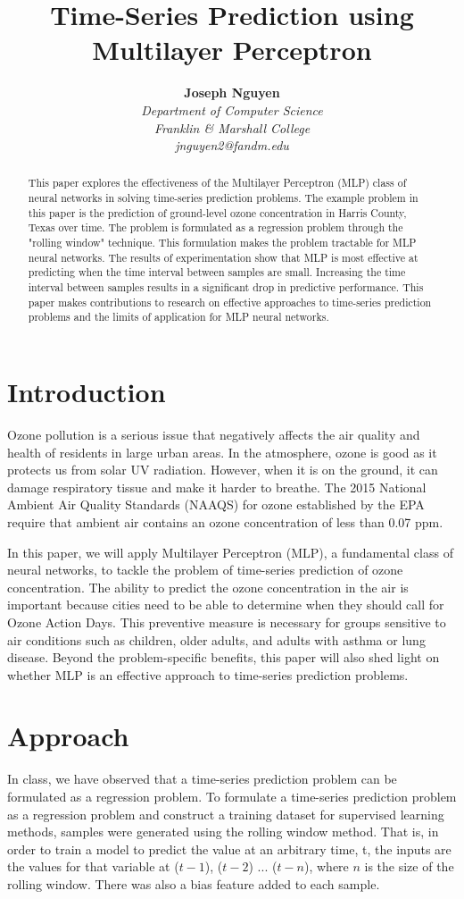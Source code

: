 \documentclass{article}
\title{\textbf{Time-Series Prediction using Multilayer Perceptron}}
\author{
    \textbf{Joseph Nguyen} \\
    \textit{Department of Computer Science} \\
    \textit{Franklin \& Marshall College} \\
    \textit{jnguyen2@fandm.edu}
}
\date{}
\begin{document}
\maketitle
\begin{abstract}
    This paper explores the effectiveness of the Multilayer Perceptron (MLP) class of neural networks in solving time-series prediction problems. The example problem in this paper is the prediction of ground-level ozone concentration in Harris County, Texas over time. The problem is formulated as a regression problem through the "rolling window" technique. This formulation makes the problem tractable for MLP neural networks. The results of experimentation show that MLP is most effective at predicting when the time interval between samples are small. Increasing the time interval between samples results in a significant drop in predictive performance. This paper makes contributions to research on effective approaches to time-series prediction problems and the limits of application for MLP neural networks.
\end{abstract}

\section{Introduction}
Ozone pollution is a serious issue that negatively affects the air quality and health of residents in large urban areas. In the atmosphere, ozone is good as it protects us from solar UV radiation. However, when it is on the ground, it can damage respiratory tissue and make it harder to breathe. The 2015 National Ambient Air Quality Standards (NAAQS) for ozone established by the EPA require that ambient air contains an ozone concentration of less than 0.07 ppm. \cite{epanaaqs}

In this paper, we will apply Multilayer Perceptron (MLP), a fundamental class of neural networks, to tackle the problem of time-series prediction of ozone concentration. The ability to predict the ozone concentration in the air is important because cities need to be able to determine when they should call for Ozone Action Days. This preventive measure is necessary for groups sensitive to air conditions such as children, older adults, and adults with asthma or lung disease. Beyond the problem-specific benefits, this paper will also shed light on whether MLP is an effective approach to time-series prediction problems.

\section{Approach}
In class, we have observed that a time-series prediction problem can be formulated as a regression problem. To formulate a time-series prediction problem as a regression problem and construct a training dataset for supervised learning methods, samples were generated using the rolling window method. \cite{rollingwindow} That is, in order to train a model to predict the value at an arbitrary time, t, the inputs are the values for that variable at ($t - 1$), ($t - 2$) ... ($t - n$), where $n$ is the size of the rolling window. There was also a bias feature added to each sample.
\end{document}
